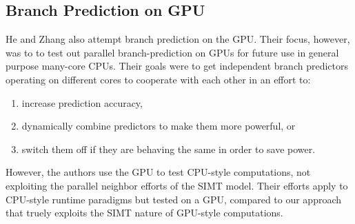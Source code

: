 \documentclass[conference]{IEEEtran}
\begin{document}


\subsection{Branch Prediction on GPU}

He and Zhang \cite{Zhang09} also attempt branch prediction on the GPU.  Their focus, however, was to to test out parallel branch-prediction on GPUs for future use in general purpose many-core CPUs.  Their goals were to get independent branch predictors operating on different cores to cooperate with each other in an effort to:

\begin{enumerate}
	\item increase prediction accuracy,
	\item dynamically combine predictors to make them more powerful, or
	\item switch them off if they are behaving the same in order to save power.
\end{enumerate}

However, the authors use the GPU to test CPU-style computations, not exploiting the parallel neighbor efforts of the SIMT model.  Their efforts apply to CPU-style runtime paradigms but tested on a GPU, compared to our approach that truely exploits the SIMT nature of GPU-style computations.
\end{document}
